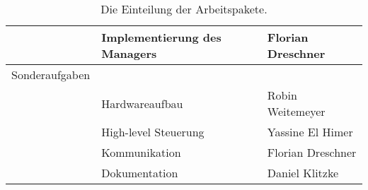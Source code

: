 \begin{table}[H]
{\begin{tabular}{|p{5cm}|p{5cm}|p{5cm}|}
 & Implementierung des Managers & Florian Dreschner  \\ \hline
 Sonderaufgaben & & \\ \hline
 & Hardwareaufbau & Robin Weitemeyer \\ \hline
 & High-level Steuerung & Yassine El Himer \\ \hline
 & Kommunikation & Florian Dreschner \\ \hline
 & Dokumentation & Daniel Klitzke \\ \hline
 \end{tabular}
}
 \caption{Die Einteilung der Arbeitspakete.}
 \label{tab:work-packages}
\end{table}